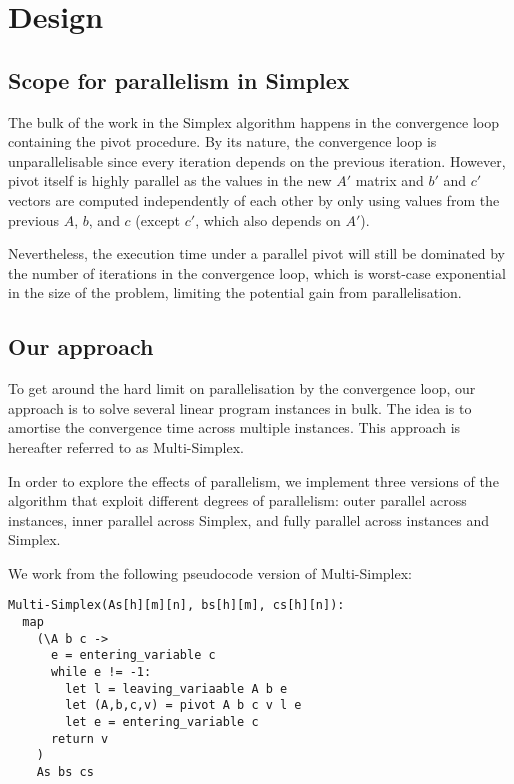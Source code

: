 \section{Design}

\subsection{Scope for parallelism in Simplex}
The bulk of the work in the Simplex algorithm happens in the convergence loop containing the pivot procedure. By its nature, the convergence loop is unparallelisable since every iteration depends on the previous iteration. However, pivot itself is highly parallel as the values in the new $A'$ matrix and $b'$ and $c'$  vectors are computed independently of each other by only using values from the previous $A$, $b$, and $c$ (except $c'$, which also depends on $A'$).

Nevertheless, the execution time under a parallel pivot will still be dominated by the number of iterations in the convergence loop, which is worst-case exponential in the size of the problem, limiting the potential gain from parallelisation.

\subsection{Our approach}
To get around the hard limit on parallelisation by the convergence loop, our approach is to solve several linear program instances in bulk. The idea is to amortise the convergence time across multiple instances. This approach is hereafter referred to as Multi-Simplex.

In order to explore the effects of parallelism, we implement three versions of the algorithm that exploit different degrees of parallelism: outer parallel across instances, inner parallel across Simplex, and fully parallel across instances and Simplex.

We work from the following pseudocode version of Multi-Simplex:
\begin{verbatim}
Multi-Simplex(As[h][m][n], bs[h][m], cs[h][n]):
  map
    (\A b c ->
      e = entering_variable c
      while e != -1:
        let l = leaving_variaable A b e
        let (A,b,c,v) = pivot A b c v l e
        let e = entering_variable c
      return v
    )
    As bs cs
\end{verbatim}

